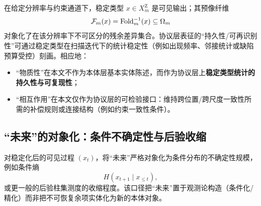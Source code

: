 在给定分辨率与约束通道下，稳定类型 $x\in X_m^{\mathrm Z}$ 是可见输出；其预像纤维
\[
\mathcal{F}_m(x)=\mathrm{Fold}_m^{-1}(x)\subseteq\Omega_m
\]
对象化了在该分辨率下不可区分的残余差异集合。协议层表征的“持久性/可再识别性”可通过稳定类型在扫描迭代下的统计稳定性（例如出现频率、邻接统计或缺陷预算受控）刻画。相应地：
\begin{itemize}
  \item “物质性”在本文不作为本体层基本实体陈述，而作为协议层上\textbf{稳定类型统计的持久性与可复现性}；
  \item “相互作用”在本文仅作为协议层的可检验接口：维持跨位置/跨尺度一致性所需的补偿规则或连接结构（例如约束一致性条件）。
\end{itemize}

\subsection{“未来”的对象化：条件不确定性与后验收缩}

对稳定化后的可见过程 $(x_t)$，将“未来”严格对象化为条件分布的不确定性规模，例如条件熵
\[
H(x_{t+1}\mid x_{\le t}),
\]
或更一般的后验柱集测度的收缩程度。该口径把“未来”置于观测论构造（条件化/精化）而非把不可恢复余项实体化为新的本体对象。

